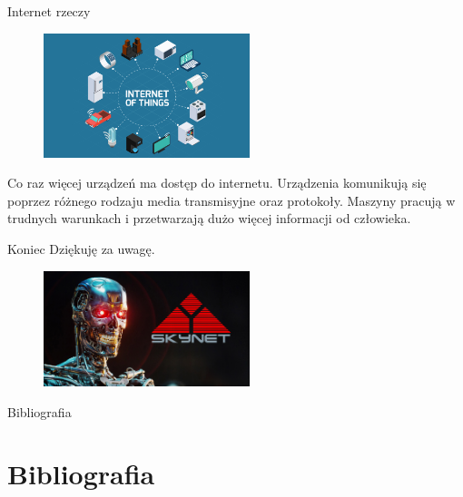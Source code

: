\documentclass{beamer}
\begin{document}
	\begin{frame}{Internet rzeczy}
		\begin{figure}
			\includegraphics[width=6cm]{iot.jpg}
		\end{figure} Co raz więcej urządzeń ma dostęp do internetu. Urządzenia komunikują się poprzez różnego rodzaju media transmisyjne oraz protokoły. Maszyny pracują w trudnych warunkach i przetwarzają dużo więcej informacji od człowieka. 
	\end{frame}
	\begin{frame}{Koniec}
		\centering Dziękuję za uwagę.
			\begin{figure}
			\includegraphics[width=6cm]{skynet.jpg}
		\end{figure}
	\end{frame}
	\begin{frame}{Bibliografia}
	\section{Bibliografia}
	
	\end{frame}
\end{document}
